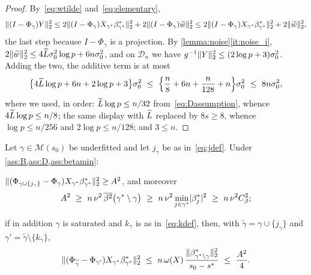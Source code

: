 \begin{proof}
    By~\eqref{eq:wtilde} and~\eqref{eq:elementary},
    \begin{equation*}
        \lVert(I-\Phi_\gamma)Y\rVert_2^{2}
        \leq2\lVert(I-\Phi_\gamma)X_{\gamma^{\ast}}\beta^{\ast}_{\gamma^{\ast}}\rVert_2^{2}
        +2\lVert(I-\Phi_\gamma)\widetilde w\rVert_2^{2}
        \leq2\lVert(I-\Phi_\gamma)X_{\gamma^{\ast}}\beta^{\ast}_{\gamma^{\ast}}\rVert_2^{2}
        +2\lVert\widetilde w\rVert_2^{2},
    \end{equation*}
    the last step because $I-\Phi_\gamma$ is a projection. By
    \cref{lemma:noise}\ref{it:noise_i}, $2\lVert\widetilde w\rVert_2^{2}\leq
    4\widetilde{L}\sigma_0^{2}\log p+6n\sigma_0^{2}$, and on $\mathcal{D}_n$ we
    have $g^{-1}\lVert Y\rVert_2^{2}\leq(2\log p+3)\sigma_0^{2}$. Adding the two,
    the additive term is at most
    \begin{equation*}
        \bigl\{4\widetilde{L}\log p+6n+2\log p+3\bigr\}\sigma_0^{2}
        \ \leq\ \Bigl\{\frac n8+6n+\frac{n}{128}+n\Bigr\}\sigma_0^{2}
        \ \leq\ 8n\sigma_0^{2},
    \end{equation*}
    where we used, in order: $\widetilde{L}\log p\leq n/32$
    from~\eqref{eq:Dassumption}, whence $4\widetilde{L}\log p\leq n/8$; the same display
    with $\widetilde{L}$ replaced by $8s\geq8$, whence $\log p\leq n/256$ and
    $2\log p\leq n/128$; and $3\leq n$.
\end{proof}

\begin{lemma}
    \label{lemma:forward}
    Let $\gamma\in\mathscr{M}(s_0)$ be underfitted and let $j_\gamma$ be
    as in~\eqref{eq:jdef}. Under \cref{ass:B,ass:D,ass:betamin}:
    \begin{equivcond}
        \item\label{it:fs_a}
        $\lVert(\Phi_{\gamma\cup\{j_\gamma\}}-\Phi_\gamma)
            X_{\gamma^{\ast}}\beta^{\ast}_{\gamma^{\ast}}\rVert_2^{2}\geq A^{2}$, and moreover
        \begin{equation}
            \label{eq:Alower}
            A^{2}\ \geq\ n\,\nu^{2}\,
            \overline{\beta^{2}}\bigl(\gamma^{\ast}\setminus\gamma\bigr)
            \ \geq\ n\,\nu^{2}\min_{j\in\gamma^{\ast}}
            \lvert\beta^\ast_j\rvert^{2}
            \ \geq\ n\,\nu^{2}C_\beta^{2} ;
        \end{equation}
        \item\label{it:fs_b} if in addition $\gamma$ is saturated and
        $k_\gamma$ is as in~\eqref{eq:kdef}, then, with
        $\widetilde\gamma=\gamma\cup\{j_\gamma\}$ and
        $\gamma'=\widetilde\gamma\setminus\{k_\gamma\}$,
        \begin{equation*}
            \lVert(\Phi_{\widetilde\gamma}-\Phi_{\gamma'})
                X_{\gamma^{\ast}}\beta^{\ast}_{\gamma^{\ast}}\rVert_2^{2}
            \ \leq\ n\,\omega(X)\,
            \frac{\lVert\beta^\ast_{\gamma^{\ast}\setminus\gamma}\rVert_2^{2}}
            {s_0-s^{\ast}}
            \ \leq\ \frac{A^{2}}{4} .
        \end{equation*}
    \end{equivcond}
\end{lemma}

